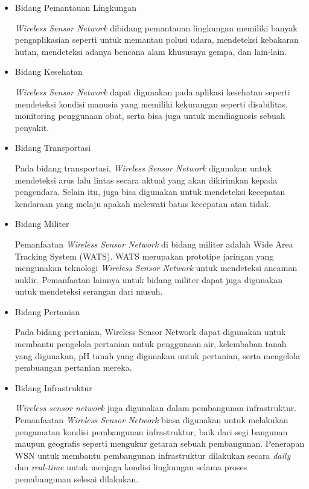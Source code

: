 \begin{itemize}
	\item Bidang Pemantauan Lingkungan
	
	
	\textit{Wireless Sensor Network} dibidang pemantauan lingkungan memiliki banyak pengaplikasian seperti untuk memantau polusi udara, mendeteksi kebakaran hutan, mendeteksi adanya bencana alam khususnya gempa, dan lain-lain.
	
	\item Bidang Kesehatan
	
	\textit{Wireless Sensor Network} dapat digunakan pada aplikasi kesehatan seperti mendeteksi kondisi manusia yang memiliki kekurangan seperti disabilitas, monitoring penggunaan obat, serta bisa juga untuk mendiagnosis sebuah penyakit.
	
	\item Bidang Transportasi
	
	Pada bidang transportasi, \textit{Wireless Sensor Network} digunakan untuk mendeteksi arus lalu lintas secara aktual yang akan dikirimkan kepada pengendara. Selain itu, juga bisa digunakan untuk mendeteksi kecepatan kendaraan yang melaju apakah melewati batas kecepatan atau tidak.
	
	\item Bidang Militer
	
	Pemanfaatan \textit{Wireless Sensor Network} di bidang militer adalah Wide Area Tracking System (WATS). WATS merupakan prototipe jaringan yang mengunakan teknologi \textit{Wireless Sensor Network} untuk mendeteksi ancaman nuklir. Pemanfaatan lainnya untuk bidang militer dapat juga digunakan untuk mendeteksi serangan dari musuh.
	
	\item Bidang Pertanian
	
	Pada bidang pertanian, Wireless Sensor Network dapat digunakan untuk membantu pengelola pertanian untuk penggunaan air, kelembaban tanah yang digunakan, pH tanah yang digunakan untuk pertanian, serta mengelola pembuangan pertanian mereka.
	
	\item Bidang Infrastruktur
	
	\textit{Wireless sensor network} juga digunakan dalam pembangunan infrastruktur. Pemanfaatan \textit{Wireless Sensor Network} biasa digunakan untuk melakukan pengamatan kondisi pembangunan infrastruktur, baik dari segi bangunan maupun geografis seperti mengukur getaran sebuah pembangunan. Penerapan WSN untuk membantu pembangunan infrastruktur dilakukan secara \textit{daily} dan \textit{real-time} untuk menjaga kondisi lingkungan selama proses pemabangunan selesai dilakukan.
\end{itemize}

